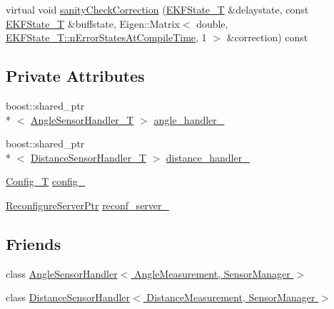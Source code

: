 \begin{DoxyCompactItemize}
\item 
virtual void \hyperlink{classmsf__spherical__position_1_1SensorManager_a76b7364dda73170d1cacaa28660b6120}{sanity\-Check\-Correction} (\hyperlink{classmsf__spherical__position_1_1SensorManager_afd0df05266caa980a03e98b0d9fd1fef}{E\-K\-F\-State\-\_\-\-T} \&delaystate, const \hyperlink{classmsf__spherical__position_1_1SensorManager_afd0df05266caa980a03e98b0d9fd1fef}{E\-K\-F\-State\-\_\-\-T} \&buffstate, Eigen\-::\-Matrix$<$ double, \hyperlink{structmsf__core_1_1GenericState__T_a20545d9aacd8f84bc1a97a873310cd5fab0136c5805e4e8d75677885fcaad5901}{E\-K\-F\-State\-\_\-\-T\-::n\-Error\-States\-At\-Compile\-Time}, 1 $>$ \&correction) const 
\end{DoxyCompactItemize}
\subsection*{Private Attributes}
\begin{DoxyCompactItemize}
\item 
boost\-::shared\-\_\-ptr\\*
$<$ \hyperlink{classmsf__spherical__position_1_1SensorManager_ae4c6b1d54308f35a6b14174068a79922}{Angle\-Sensor\-Handler\-\_\-\-T} $>$ \hyperlink{classmsf__spherical__position_1_1SensorManager_a7769f58ffe11d6ec766b487fc5b572e6}{angle\-\_\-handler\-\_\-}
\item 
boost\-::shared\-\_\-ptr\\*
$<$ \hyperlink{classmsf__spherical__position_1_1SensorManager_aa3757032c5c9ee975d70be8502956e23}{Distance\-Sensor\-Handler\-\_\-\-T} $>$ \hyperlink{classmsf__spherical__position_1_1SensorManager_abc9104c63afbb93f6cc284d4e936d773}{distance\-\_\-handler\-\_\-}
\item 
\hyperlink{namespacemsf__spherical__position_a48bbe0c42021c86a6ed32ae9c30df686}{Config\-\_\-\-T} \hyperlink{classmsf__spherical__position_1_1SensorManager_af9fb43302a890e41f2b335b3c719bc90}{config\-\_\-}
\item 
\hyperlink{namespacemsf__spherical__position_aecf7024b0d845666e7cf52970e31217f}{Reconfigure\-Server\-Ptr} \hyperlink{classmsf__spherical__position_1_1SensorManager_a121dcb0786d2a10509caa5b901a04dff}{reconf\-\_\-server\-\_\-}
\end{DoxyCompactItemize}
\subsection*{Friends}
\begin{DoxyCompactItemize}
\item 
class \hyperlink{classmsf__spherical__position_1_1SensorManager_a56e4e65831c241dcb391344e594958a7}{Angle\-Sensor\-Handler$<$ Angle\-Measurement, Sensor\-Manager $>$}
\item 
class \hyperlink{classmsf__spherical__position_1_1SensorManager_a821f5fe9ffeb041a3f08bc5bdd718a07}{Distance\-Sensor\-Handler$<$ Distance\-Measurement, Sensor\-Manager $>$}
\end{DoxyCompactItemize}
